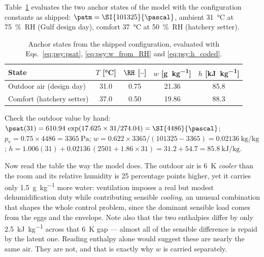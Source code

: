 Table~\ref{tab:psy:design} evaluates the two anchor states of the model with the configuration
constants as shipped: $\patm = \SI{101325}{\pascal}$, ambient \SI{31}{\celsius} at
\SI{75}{\percent}~RH (Gulf design day), comfort \SI{37}{\celsius} at \SI{50}{\percent}~RH (hatchery
setter).

\begin{table}[htbp]
\centering
\caption{Anchor states from the shipped configuration, evaluated with
Eqs.~\eqref{eq:psy:psat}, \eqref{eq:psy:w_from_RH} and \eqref{eq:psy:h_coded}.}
\label{tab:psy:design}
\begin{tabular}{@{}lcccc@{}}
\toprule
State & $T$ [\si{\celsius}] & $\RH$ [--]
& $w$ [\si{\gram\per\kilogram}] & $h$ [\si{\kilo\joule\per\kilogram}] \\
\midrule
Outdoor air (design day)  & 31.0 & 0.75 & 21.36 & 85.8 \\
Comfort (hatchery setter) & 37.0 & 0.50 & 19.86 & 88.3 \\
\bottomrule
\end{tabular}
\end{table}

Check the outdoor value by hand: $\psat(31) = 610.94\,\exp(17.625 \times 31/274.04) =
\SI{4486}{\pascal}$; $p_{\mathrm{v}} = 0.75 \times 4486 = \SI{3365}{\pascal}$; $w = 0.622 \times
3365/(101325 - 3365) = \SI{0.02136}{\kilogram\per\kilogram}$; $h = 1.006(31) + 0.02136\,(2501 + 1.86
\times 31) = 31.2 + 54.7 = \SI{85.8}{\kilo\joule\per\kilogram}$.

Now read the table the way the model does. The outdoor air is \SI{6}{\kelvin} \emph{cooler} than the
room and its relative humidity is 25 percentage points higher, yet it carries only
\SI{1.5}{\gram\per\kilogram} more water: ventilation imposes a real but modest dehumidification duty
while contributing sensible \emph{cooling}, an unusual combination that shapes the whole control
problem, since the dominant sensible load comes from the eggs and the envelope. Note also that the
two enthalpies differ by only \SI{2.5}{\kilo\joule\per\kilogram} across that \SI{6}{\kelvin} gap ---
almost all of the sensible difference is repaid by the latent one. Reading enthalpy alone would
suggest these are nearly the same air. They are not, and that is exactly why $w$ is carried
separately.
